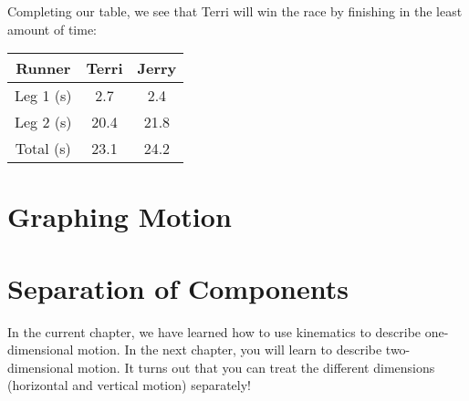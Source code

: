Completing our table, we see that Terri will win the race by finishing in the 
least amount of time:
\begin{center}
\begin{tabular}{|c|c|c|}
\hline
Runner & Terri & Jerry\\\hline
Leg 1 (s) & 2.7 & 2.4 \\\hline
Leg 2 (s) & 20.4 & 21.8 \\\hline
Total (s) & 23.1 & 24.2 \\\hline
\end{tabular}
\end{center}

\section{Graphing Motion}





\section{Separation of Components}
In the current chapter, we have learned how to use kinematics to describe one-dimensional motion. In the next chapter, you will learn to describe two-dimensional motion. It turns out that you can treat the different dimensions (horizontal and vertical motion) separately! %